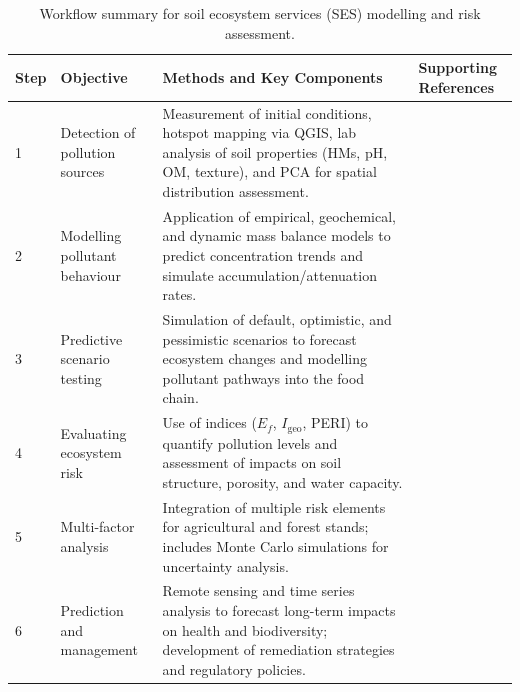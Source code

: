\documentclass[preprint,12pt]{elsarticle}            %
\begin{document}
\begin{table}[htbp]
\centering
\caption{Workflow summary for soil ecosystem services (SES) modelling and
    risk assessment.}
\label{tab:ses_workflow_v2}
\begin{tabularx}{\textwidth}{p{0.6cm} p{3.0cm} X p{4.5cm}}
\toprule
\textbf{Step} & \textbf{Objective} & \textbf{Methods and Key Components}
    & \textbf{Supporting References} \\
\midrule
1 & Detection of pollution sources
    & Measurement of initial conditions, hotspot mapping via QGIS, lab
      analysis of soil properties (HMs, pH, OM, texture), and PCA for
      spatial distribution assessment.
    & \cite{Adewumi2024,ElSorogy2025,Feng2024,Lemenkova2021,Mukhopadhyay2020,Wan2019} \\[6pt]
2 & Modelling pollutant behaviour
    & Application of empirical, geochemical, and dynamic mass balance models
      to predict concentration trends and simulate accumulation/attenuation
      rates.
    & \cite{Giannakis2017,Koukianaki2025,LindhLemenkova2022b,Mohammad2025,PerezLucas2025,Xu2026} \\[6pt]
3 & Predictive scenario testing
    & Simulation of default, optimistic, and pessimistic scenarios to
      forecast ecosystem changes and modelling pollutant pathways into the
      food chain.
    & \cite{Appel2022,GonzalezRodriguez2011,Hossini2025,Lemenkova2024a,Wang2025,Yasir2025} \\[6pt]
4 & Evaluating ecosystem risk
    & Use of indices ($E_f$, $I_{\mathrm{geo}}$, PERI) to quantify
      pollution levels and assessment of impacts on soil structure,
      porosity, and water capacity.
    & \cite{AnsoarRodriguez2025,Chukwuonye2025,Egbueri2020,Ferreira2022,Kim2024,Li2025a} \\[6pt]
5 & Multi-factor analysis
    & Integration of multiple risk elements for agricultural and forest
      stands; includes Monte Carlo simulations for uncertainty analysis.
    & \cite{Lemenkova2025c,Li2025a,Lu2020,Olah2025,Proshad2025,Wang2024b} \\[6pt]
6 & Prediction and management
    & Remote sensing and time series analysis to forecast long-term impacts
      on health and biodiversity; development of remediation strategies and
      regulatory policies.
    & \cite{Fan2025,Lemenkova2025e,Lemenkova2025d,Pan2019,Stojic2019,Xu2025} \\
\bottomrule
\end{tabularx}
\end{table}
\end{document}
